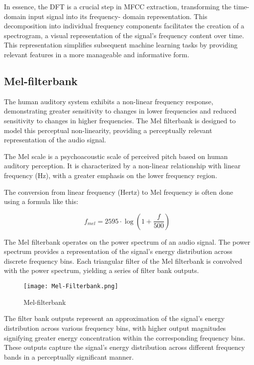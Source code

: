 In essence, the DFT is a crucial step in MFCC extraction,
transforming the time-domain input signal into its frequency-
domain representation. This decomposition into individual
frequency components facilitates the creation of a spectrogram,
a visual representation of the signal's frequency content over
time. This representation simplifies subsequent machine
learning tasks by providing relevant features in a more
manageable and informative form.

\subsection{Mel-filterbank}
The human auditory system exhibits a non-linear frequency
response, demonstrating greater sensitivity to changes in
lower frequencies and reduced sensitivity to changes in higher
frequencies. The Mel filterbank is designed to model this
perceptual non-linearity, providing a perceptually relevant
representation of the audio signal.

The Mel scale is a psychoacoustic scale of perceived pitch
based on human auditory perception. It is characterized by a
non-linear relationship with linear frequency (Hz), with a
greater emphasis on the lower frequency region.

The conversion from linear frequency (Hertz) to Mel frequency
is often done using a formula like this:

\begin{equation}
    f_{mel} = 2595 \cdot \log\left(1 + \frac{f}{500}\right)
\end{equation}

The Mel filterbank operates on the power spectrum of an audio
signal. The power spectrum provides a representation of the
signal's energy distribution across discrete frequency bins.
Each triangular filter of the Mel filterbank is convolved with
the power spectrum, yielding a series of filter bank outputs.

\vspace{-1em}
\begin{figure}[H]
    \centering
    \texttt{[image: Mel-Filterbank.png]}
    \caption{Mel-filterbank}
    \label{fig:mel-filterbank}
\end{figure}
\vspace{-1em}

The filter bank outputs represent an approximation of the
signal's energy distribution across various frequency bins,
with higher output magnitudes signifying greater energy
concentration within the corresponding frequency bins. These
outputs capture the signal's energy distribution across
different frequency bands in a perceptually significant
manner.


